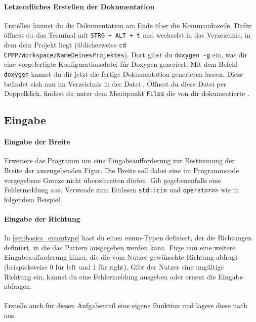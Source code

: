 

\paragraph{Letzendliches Erstellen der Dokumentation}
Erstellen kannst du die Dokumentation am Ende über die Kommandozeile.
Dafür öffnest du das Terminal mit \lstinline{STRG + ALT + t} und wechselst in das Verzeichnis, in dem dein Projekt liegt (üblicherweise \lstinline{cd CPPP/Workspace/NameDeinesProjektes}).
Dort gibst du \lstinline{doxygen -g} ein, was dir eine vorgefertigte Konfigurationsdatei für Doxygen generiert. Mit dem Befehl \lstinline{doxygen} kannst du dir jetzt die fertige Dokumentation generieren lassen.
Diese befindet sich nun im Verzeichnis  in der Datei .
Öffnest du diese Datei per Doppelklick, findest du unter dem Menüpunkt \lstinline{Files} die von dir dokumentierte .

\subsection{Eingabe}
\paragraph{Eingabe der Breite}
Erweitere das Programm um eine Eingabeaufforderung zur Bestimmung der Breite der auszugebenden Figur.
Die Breite soll dabei eine im Programmcode vorgegebene Grenze nicht überschreiten dürfen. 
Gib gegebenenfalls eine Fehlermeldung aus.
Verwende zum Einlesen \lstinline{std::cin} und \lstinline{operator>>} wie in folgendem Beispiel.

  
  
\paragraph{Eingabe der Richtung}
In \ref{sec:basics_enumtype} hast du einen enum-Typen definiert, der die Richtungen definiert, in die das Pattern ausgegeben werden kann. Füge nun eine weitere Eingabeaufforderung hinzu, die die vom Nutzer gewünschte Richtung abfragt (beispielsweise 0 für left und 1 für right). Gibt der Nutzer eine ungültige Richtung ein, kannst du eine Fehlermeldung ausgeben oder erneut die Eingabe abfragen.\\
\\
Erstelle auch für diesen Aufgabenteil eine eigene Funktion und lagere diese nach  aus.

